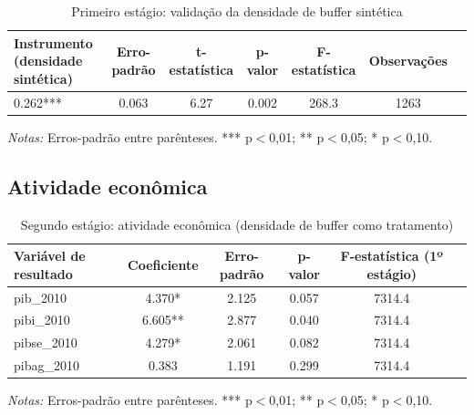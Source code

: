 \documentclass[12pt,a4paper]{article}
\begin{document}
\begin{table}[htbp]
\centering
\scriptsize
\caption{Primeiro estágio: validação da densidade de buffer sintética}
\label{tab:primeiro_estagio_buffer}
\begin{tabular}{lcccccc}
\toprule
Instrumento (densidade sintética) & Erro-padrão & t-estatística & p-valor & F-estatística & Observações \\
\midrule
0.262*** & 0.063 & 6.27 & 0.002 & 268.3 & 1263 \\
\bottomrule
\end{tabular}
\begin{minipage}{0.95\textwidth}
\scriptsize \textit{Notas:} Erros-padrão entre parênteses. *** p$<$0,01; ** p$<$0,05; * p$<$0,10.
\end{minipage}
\end{table}

\subsection{Atividade econômica}
\begin{table}[htbp]
\centering
\scriptsize
\caption{Segundo estágio: atividade econômica (densidade de buffer como tratamento)}
\label{tab:segundo_estagio_economica}
\begin{tabular}{lccccc}
\toprule
Variável de resultado & Coeficiente & Erro-padrão & p-valor & F-estatística (1º estágio) \\
\midrule
pib_2010 & 4.370* & 2.125 & 0.057 & 7314.4 \\
pibi_2010 & 6.605** & 2.877 & 0.040 & 7314.4 \\
pibse_2010 & 4.279* & 2.061 & 0.082 & 7314.4 \\
pibag_2010 & 0.383 & 1.191 & 0.299 & 7314.4 \\
\bottomrule
\end{tabular}
\begin{minipage}{0.95\textwidth}
\scriptsize \textit{Notas:} Erros-padrão entre parênteses. *** p$<$0,01; ** p$<$0,05; * p$<$0,10.
\end{minipage}
\end{table}
\end{document}
